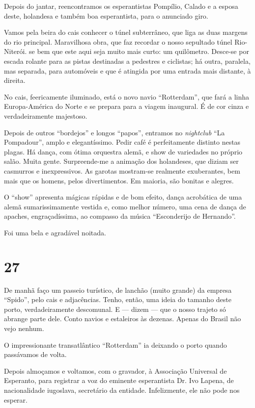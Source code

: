 Depois do jantar, reencontramos os esperantistas Pompílio, Calado e a esposa deste, holandesa e também boa esperantista, para o anunciado giro.

Vamos pela beira do cais conhecer o túnel subterrâneo, que liga as duas margens do rio principal. Maravilhosa obra, que faz recordar o nosso sepultado túnel Rio-Niterói. se bem que este aqui seja muito mais curto: um quilômetro. Desce-se por escada rolante para as pistas destinadas a pedestres e ciclistas; há outra, paralela, mas separada, para automóveis e que é atingida por uma entrada mais distante, à direita.

No cais, feericamente iluminado, está o novo navio ``Rotterdam'', que fará a linha Europa-América do Norte e se prepara para a viagem inaugural. É de cor cinza e verdadeiramente majestoso.

Depois de outros ``bordejos'' e longos ``papos'', entramos no \textit{nightclub} ``La Pompadour'', amplo e elegantíssimo. Pedir café é perfeitamente distinto nestas plagas. Há dança, com ótima orquestra alemã, e show de variedades no próprio salão. Muita gente. Surpreende-me a animação dos holandeses, que diziam ser casmurros e inexpressivos. As garotas mostram-se realmente exuberantes, bem mais que os homens, pelos divertimentos. Em maioria, são bonitas e alegres.

O ``show'' apresenta mágicas rápidas e de bom efeito, dança acrobática de uma alemã sumarissimamente vestida e, como melhor número, uma cena de dança de apaches, engraçadíssima, ao compasso da música ``Esconderijo de Hernando''.

Foi uma bela e agradável noitada.

\section*{27 \adfflatleafright {}}
De manhã faço um passeio turístico, de lanchão (muito grande) da empresa ``Spido'', pelo cais e adjacências. Tenho, então, uma ideia do tamanho deste porto, verdadeiramente descomunal. E --- dizem --- que o nosso trajeto só abrange parte dele. Conto navios e estaleiros às dezenas. Apenas do Brasil não vejo nenhum.

O impressionante transatlântico ``Rotterdam'' ia deixando o porto quando passávamos de volta.

Depois almoçamos e voltamos, com o gravador, à Associação Universal de Esperanto, para registrar a voz do eminente esperantista Dr. Ivo Lapena, de nacionalidade iugoslava, secretário da entidade. Infelizmente, ele não pode nos esperar.

